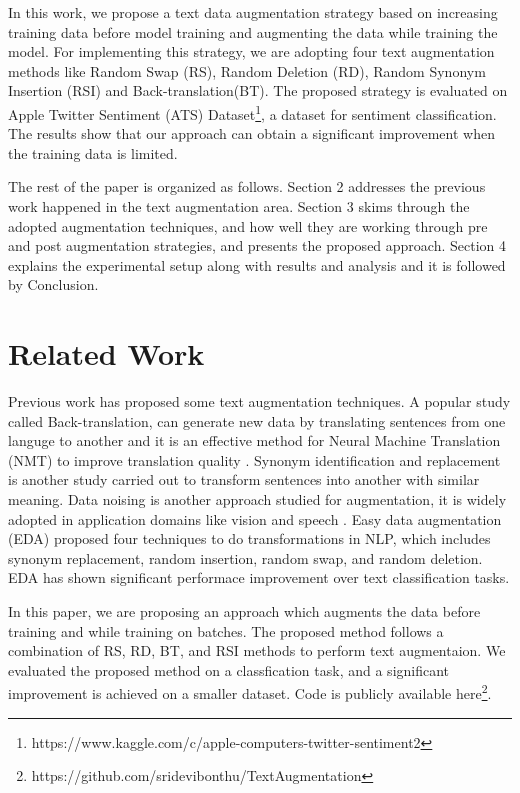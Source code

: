 \documentclass{article}
\begin{document}
In this work, we propose a text data augmentation strategy based on increasing training data before model training and augmenting the data while training the model. For implementing this strategy, we are adopting four text augmentation methods like Random Swap (RS), Random Deletion (RD), Random Synonym Insertion (RSI) and Back-translation(BT). The proposed strategy is evaluated on Apple Twitter Sentiment (ATS) Dataset\footnote{https://www.kaggle.com/c/apple-computers-twitter-sentiment2}, a dataset for sentiment classification. The results show that our approach can obtain a significant improvement when the training data is limited.

The rest of the paper is organized as follows. Section 2 addresses the previous work happened in the text augmentation area. Section 3 skims through the adopted augmentation techniques, and how well they are working through pre and post augmentation strategies, and presents the proposed approach. Section 4 explains the experimental setup along with results and analysis and it is followed by Conclusion.


\section{Related Work}
Previous work has proposed some text augmentation techniques. A popular study called Back-translation, can generate new data by translating sentences from one languge to another and it is an effective method for Neural Machine Translation (NMT) to improve translation quality \cite{fadaee2018back}. Synonym identification and replacement \cite{anders2020dynamic} is another study carried out to transform sentences into another with similar meaning. Data noising is another approach studied for augmentation, it is widely adopted in application domains like vision and speech \cite{xie2017data}. Easy data augmentation (EDA)\cite{wei2019eda} proposed four techniques to do transformations in NLP, which includes synonym replacement, random insertion, random swap, and random deletion. EDA has shown significant performace improvement over text classification tasks.

In this paper, we are proposing an approach which augments the data before training and while training on batches. The proposed method follows a combination of RS, RD, BT, and RSI methods to perform text augmentaion. We evaluated the proposed method on a classfication task, and a significant improvement is achieved on a smaller dataset. Code is publicly available here\footnote{https://github.com/sridevibonthu/TextAugmentation}.
\end{document}
